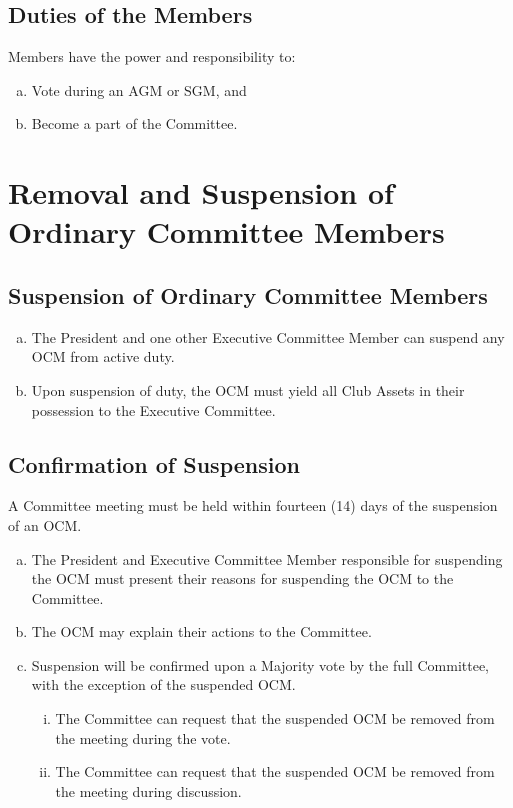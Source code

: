 \documentclass[a4paper,12pt]{article}
\begin{document}
\subsection{Duties of the Members}

Members have the power and responsibility to:

\begin{enumerate}[a)]
	\item Vote during an AGM or SGM, and
	\item Become a part of the Committee.
\end{enumerate}

\section{Removal and Suspension of Ordinary Committee Members}

\subsection{Suspension of Ordinary Committee Members}

\begin{enumerate}[a)]
	\item The President and one other Executive Committee Member can suspend any OCM from active duty.
	\item Upon suspension of duty, the OCM must yield all Club Assets in their possession to the Executive Committee.
\end{enumerate}

\subsection{Confirmation of Suspension}

A Committee meeting must be held within fourteen (14) days of the suspension of an OCM.

\begin{enumerate}[a)]
	\item The President and Executive Committee Member responsible for suspending the OCM must present their reasons for suspending the OCM to the Committee.
	\item The OCM may explain their actions to the Committee.
	\item Suspension will be confirmed upon a Majority vote by the full Committee, with the exception of the suspended OCM.
	\begin{enumerate}[i)]
		\item The Committee can request that the suspended OCM be removed from the meeting during the vote.
		\item The Committee can request that the suspended OCM be removed from the meeting during discussion.
	\end{enumerate}
\end{enumerate}
\end{document}
